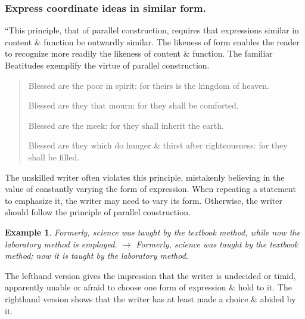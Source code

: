 \documentclass{article}
\newtheorem{example}{Example}
\begin{document}

\subsubsection{Express coordinate ideas in similar form.}
``This principle, that of parallel construction, requires that expressions similar in content \& function be outwardly similar. The likeness of form enables the reader to recognize more readily the likeness of content \& function. The familiar Beatitudes exemplify the virtue of parallel construction.
\begin{quotation}
	Blessed are the poor in spirit: for theirs is the kingdom of heaven.
	
	Blessed are they that mourn: for they shall be comforted.
	
	Blessed are the meek: for they shall inherit the earth.
	
	Blessed are they which do hunger \& thirst after righteousness: for they shall be filled.
\end{quotation}
The unskilled writer often violates this principle, mistakenly believing in the value of constantly varying the form of expression. When repeating a statement to emphasize it, the writer may need to vary its form. Otherwise, the writer should follow the principle of parallel construction.
\begin{example}
	Formerly, science was taught by the textbook method, while now the laboratory method is employed. $\to$ Formerly, science was taught by the textbook method; now it is taught by the laboratory method.
\end{example}
The lefthand version gives the impression that the writer is undecided or timid, apparently unable or afraid to choose one form of expression \& hold to it. The righthand version shows that the writer has at least made a choice \& abided by it.
\end{document}
